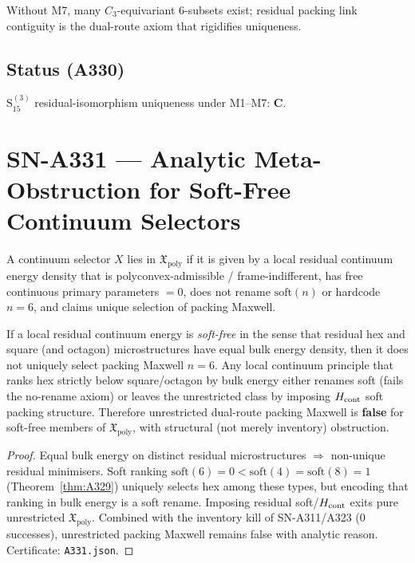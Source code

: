 \begin{remark}
Without M7, many $C_3$-equivariant $6$-subsets exist; residual packing link contiguity is the dual-route axiom that rigidifies uniqueness.
\end{remark}

\subsection*{Status (A330)}
$\mathrm{S}_{15}^{(3)}$ residual-isomorphism uniqueness under M1--M7: \textbf{C}.

\section{SN-A331 --- Analytic Meta-Obstruction for Soft-Free Continuum Selectors}
\label{sec:SN-A331}

\begin{definition}
\label{def:A331-X}
A continuum selector $X$ lies in $\mathfrak{X}_{\mathrm{poly}}$ if it is given by a local residual continuum energy density that is polyconvex-admissible / frame-indifferent, has free continuous primary parameters $=0$, does not rename $\mathrm{soft}(n)$ or hardcode $n=6$, and claims unique selection of packing Maxwell.
\end{definition}

\begin{theorem}
\label{thm:A331}
If a local residual continuum energy is \emph{soft-free} in the sense that residual hex and square (and octagon) microstructures have equal bulk energy density, then it does not uniquely select packing Maxwell $n=6$.
Any local continuum principle that ranks hex strictly below square/octagon by bulk energy either renames soft (fails the no-rename axiom) or leaves the unrestricted class by imposing $H_{\rm cont}$ soft packing structure.
Therefore unrestricted dual-route packing Maxwell is \textbf{false} for soft-free members of $\mathfrak{X}_{\mathrm{poly}}$, with structural (not merely inventory) obstruction.
\end{theorem}

\begin{proof}
Equal bulk energy on distinct residual microstructures $\Rightarrow$ non-unique residual minimisers.
Soft ranking $\mathrm{soft}(6)=0<\mathrm{soft}(4)=\mathrm{soft}(8)=1$ (Theorem~\ref{thm:A329}) uniquely selects hex among these types, but encoding that ranking in bulk energy is a soft rename.
Imposing residual soft/$H_{\rm cont}$ exits pure unrestricted $\mathfrak{X}_{\mathrm{poly}}$.
Combined with the inventory kill of SN-A311/A323 ($0$ successes), unrestricted packing Maxwell remains false with analytic reason.
Certificate: \texttt{A331.json}.
\end{proof}

